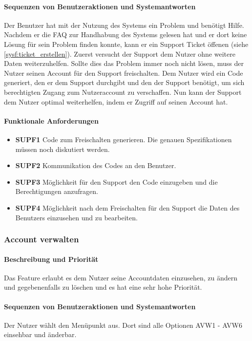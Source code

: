 \paragraph{Sequenzen von Benutzeraktionen und Systemantworten}
Der Benutzer hat mit der Nutzung des Systems ein Problem und benötigt Hilfe.
Nachdem er die FAQ zur Handhabung des Systems gelesen hat und er dort keine Lösung für sein Problem finden konnte,
kann er ein Support Ticket öffenen (siehe \ref{sysf:ticket_erstellen}).
Zuerst versucht der Support dem Nutzer ohne weitere Daten weiterzuhelfen.
Sollte dies das Problem immer noch nicht lösen, muss der Nutzer seinen Account für den Support freischalten.
Dem Nutzer wird ein Code generiert, den er dem Support durchgibt und den der Support benötigt,
um sich berechtigten Zugang zum Nutzeraccount zu verschaffen.
Nun kann der Support dem Nutzer optimal weiterhelfen, indem er Zugriff auf seinen Account hat.
\paragraph{Funktionale Anforderungen}
\begin{itemize}
	\item \textbf{SUPF1} Code zum Freischalten generieren. Die genauen Spezifikationen müssen noch diskutiert werden.
	\item \textbf{SUPF2} Kommunikation des Codes an den Benutzer.
	\item \textbf{SUPF3} Möglichkeit für den Support den Code einzugeben und die Berechtigungen anzufragen.
	\item \textbf{SUPF4} Möglichkeit nach dem Freischalten für den Support die Daten des Benutzers einzusehen und zu bearbeiten.

\end{itemize}


\subsubsection{Account verwalten}
\paragraph{Beschreibung und Priorität}
Das Feature erlaubt es dem Nutzer seine Accountdaten einzusehen, zu ändern und gegebenenfalls zu löschen
und es hat eine sehr hohe Priorität.

\paragraph{Sequenzen von Benutzeraktionen und Systemantworten}
Der Nutzer wählt den Menüpunkt  aus.
Dort sind alle Optionen AVW1 - AVW6 einsehbar und änderbar.

